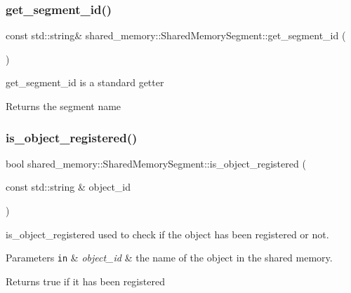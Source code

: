 \subsubsection{\texorpdfstring{get\+\_\+segment\+\_\+id()}{get\_segment\_id()}}
{\footnotesize\ttfamily const std\+::string\& shared\+\_\+memory\+::\+Shared\+Memory\+Segment\+::get\+\_\+segment\+\_\+id (\begin{DoxyParamCaption}{ }\end{DoxyParamCaption})\hspace{0.3cm}{\ttfamily [inline]}}



get\+\_\+segment\+\_\+id is a standard getter 

\begin{DoxyReturn}{Returns}
the segment name 
\end{DoxyReturn}
\mbox{\label{classshared__memory_1_1SharedMemorySegment_ae7a86bba2f8158917b48c0bd3a7bdf9b}} 
\subsubsection{\texorpdfstring{is\+\_\+object\+\_\+registered()}{is\_object\_registered()}}
{\footnotesize\ttfamily bool shared\+\_\+memory\+::\+Shared\+Memory\+Segment\+::is\+\_\+object\+\_\+registered (\begin{DoxyParamCaption}\item[{const std\+::string \&}]{object\+\_\+id }\end{DoxyParamCaption})\hspace{0.3cm}{\ttfamily [inline]}}



is\+\_\+object\+\_\+registered used to check if the object has been registered or not. 


\begin{DoxyParams}[1]{Parameters}
\mbox{\tt in}  & {\em object\+\_\+id} & the name of the object in the shared memory. \\
\hline
\end{DoxyParams}
\begin{DoxyReturn}{Returns}
true if it has been registered 
\end{DoxyReturn}
\mbox{\label{classshared__memory_1_1SharedMemorySegment_a6987e8225fd20dbab12e5bb3f5305b75}} 
